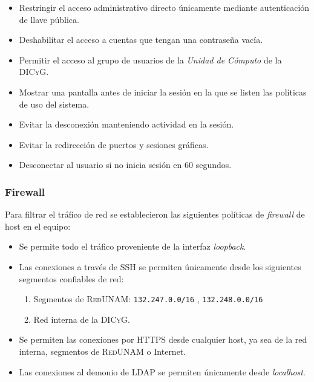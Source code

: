 \begin{itemize}
  \item Restringir el acceso administrativo directo \'{u}nicamente mediante autenticaci\'{o}n de llave p\'{u}blica.
  \item Deshabilitar el acceso a cuentas que tengan una contrase\~{n}a vac\'{i}a.
  \item Permitir el acceso al grupo de usuarios de la \textit{Unidad de C\'{o}mputo} de la \textsc{DICyG}.
  \item  Mostrar una pantalla antes de iniciar la sesi\'{o}n en la que se listen las pol\'{i}ticas de uso del sistema.
  \item Evitar la desconexi\'{o}n manteniendo actividad en la sesi\'{o}n.
  \item Evitar la redirecci\'{o}n de puertos y sesiones gr\'{a}ficas.
  \item Desconectar al usuario si no inicia sesi\'{o}n en 60 segundos.
\end{itemize}

        \subsubsection {Firewall}

Para filtrar el tr\'{a}fico de red se establecieron las siguientes pol\'{i}ticas de \textit{firewall} de host en el equipo:

\begin{itemize}
  \item Se permite todo el tr\'{a}fico proveniente de la interfaz \textit{loopback}.
  \item Las conexiones a trav\'{e}s de \textsc{SSH} se permiten \'{u}nicamente desde los siguientes segmentos confiables de red:
  \begin{enumerate}
    \item Segmentos de \textsc{RedUNAM}: \texttt{132.247.0.0/16} , \texttt{132.248.0.0/16}
    \item Red interna de la \textsc{DICyG}.
  \end{enumerate}
  \item Se permiten las conexiones por \textsc{HTTPS} desde cualquier host, ya sea de la red interna, segmentos de \textsc{RedUNAM} o Internet.
  \item Las conexiones al demonio de \textsc{LDAP} se permiten \'{u}nicamente desde \textit{localhost}.
\end{itemize}

